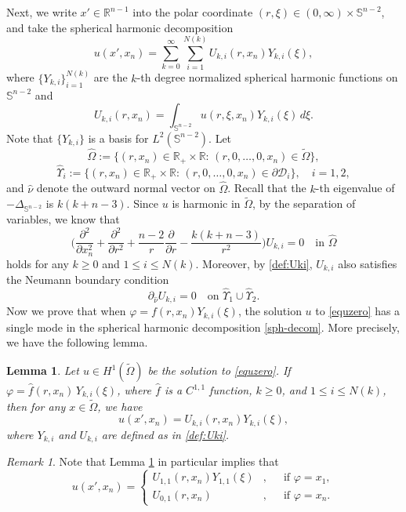 \documentclass[reqno, 10pt]{amsart}
\theoremstyle{plain}
\newtheorem{lemma}[theorem]{Lemma}
\theoremstyle{definition}
\theoremstyle{remark}
\newtheorem{remark}[theorem]{Remark}
\numberwithin{equation}{section}
\newcommand{\bR}{\mathbb{R}}
\newcommand{\bS}{\mathbb{S}}
\begin{document}
Next, we write $x' \in \bR^{n-1}$ into the polar coordinate $(r,\xi) \in (0,\infty) \times \bS^{n-2}$, and take the spherical harmonic decomposition
\begin{equation}\label{sph-decom}
u(x',x_n) = \sum_{k=0}^\infty \sum_{i=1}^{N(k)} U_{k,i}(r,x_n)Y_{k,i}(\xi),
\end{equation}
where $\{Y_{k,i}\}_{i=1}^{N(k)}$ are the $k$-th degree normalized spherical harmonic functions on $\bS^{n-2}$ and 
\begin{equation}\label{def:Uki}
U_{k,i}(r,x_n)=\int_{\bS^{n-2}}u(r,\xi,x_n)Y_{k,i}(\xi)\,d\xi.
\end{equation}
Note that $\{Y_{k,i}\}$ is a basis for $L^2(\bS^{n-2})$.
Let $$\hat{\Omega}:=\{(r,x_n)\in \bR_+\times \bR:\,(r,0,\ldots,0,x_n)\in\widetilde\Omega\},$$  $$\hat\Upsilon_i:=\{(r,x_n)\in \bR_+\times \bR:\,(r,0,\ldots,0,x_n)\in\partial{\mathcal{D}_i}\}, \quad i=1,2,$$
and $\hat{\nu}$ denote the outward normal vector on $\hat\Omega$.
Recall that the $k$-th eigenvalue of $-\Delta_{\bS^{n-2}}$ is $k(k+n-3)$. Since $u$ is harmonic in $\widetilde{\Omega}$, by the separation of variables, we know that 
\begin{equation}\label{separation_pde}
    \Big(\frac{\partial^2}{\partial x_n^2}+\frac{\partial^2}{\partial r^2}+\frac{n-2}{r}\frac{\partial}{\partial r}-\frac{k(k+n-3)}{r^2}\Big)U_{k,i}=0 \quad \mbox{in } \hat{\Omega}
\end{equation}
holds for any $k\ge 0$ and $1\le i\le N(k)$.
Moreover, by \eqref{def:Uki}, $U_{k,i}$ also satisfies the Neumann boundary condition 
\begin{equation}\label{bcn:Uki}
    \partial_{\hat\nu} U_{k,i}=0 \quad \mbox{on }\hat\Upsilon_1\cup\hat\Upsilon_2.
\end{equation}
Now we prove that when $\varphi=f(r,x_n)Y_{k,i}(\xi)$, the solution $u$ to \eqref{equzero} has a single mode in the spherical harmonic decomposition \eqref{sph-decom}. More precisely, we have the following lemma.
\begin{lemma}\label{lem:single_decom}
    Let $u\in H^1(\widetilde\Omega)$ be the solution to \eqref{equzero}. If $\varphi=\hat{f}(r,x_n)\,Y_{k,i}(\xi)$, where $\hat{f}$ is a $C^{1,1}$ function, $k\ge 0$, and $1\le i\le N(k)$, then for any $x\in \widetilde\Omega$, we have
$$
u(x',x_n)=U_{k,i}(r,x_n)Y_{k,i}(\xi),
$$
where $Y_{k,i}$ and $U_{k,i}$ are defined as in \eqref{def:Uki}.
\end{lemma}
\begin{remark}
    Note that Lemma \ref{lem:single_decom} in particular implies that
\begin{equation*}%
 u(x',x_n) =\left\{
 \begin{aligned}
     U_{1,1}(r,x_n)Y_{1,1}(\xi)&, &&\mbox{if } \varphi = x_1,\\
     U_{0,1}(r,x_n)&, && \mbox{if } \varphi = x_n.
 \end{aligned}
 \right.
\end{equation*}
\end{remark} 
\end{document}
